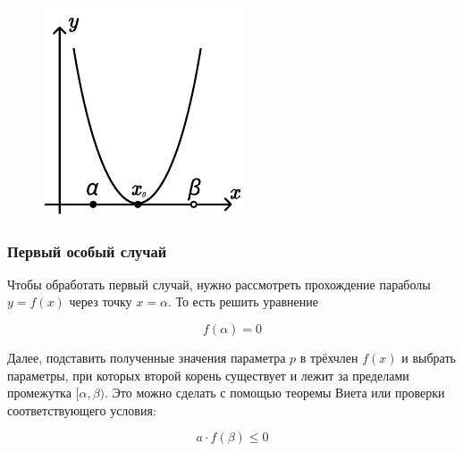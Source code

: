 \begin {figure} [h]
\begin {minipage} [t] {0.3\linewidth}
    \end {minipage}
    \hfill
    \begin {minipage} [t] {0.3\linewidth}
        \centering
        \includegraphics [width=\linewidth] {images/image_04.pdf}
    \end {minipage}
\end {figure}

\subsubsection {Первый особый случай}
Чтобы обработать первый случай, нужно рассмотреть прохождение параболы $y = f(x)$ через точку
$x = \alpha$. То есть решить уравнение

\begin {equation*}
    f(\alpha) = 0
\end {equation*}

Далее, подставить полученные значения параметра $p$ в трёхчлен $f(x)$ и выбрать параметры, при
которых второй корень существует и лежит за пределами промежутка $[\alpha, \beta)$. Это можно
сделать с помощью теоремы Виета или проверки соответствующего условия:

\begin {equation*}
    a \cdot f(\beta) \leqslant 0
\end {equation*}

